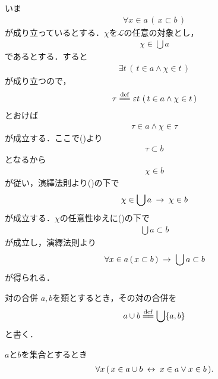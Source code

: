 	\begin{sketch}
		いま
		\begin{align}
			\forall x \in a\, (\, x \subset b\, )
			\label{fom:thm_union_of_subsets_is_subclass_1}
		\end{align}
		が成り立っているとする．$\chi$を$\mathcal{L}$の任意の対象とし，
		\begin{align}
			\chi \in \bigcup a
		\end{align}
		であるとする．すると
		\begin{align}
			\exists t\, \left(\, t \in a \wedge \chi \in t\, \right)
		\end{align}
		が成り立つので，
		\begin{align}
			\tau \defeq \varepsilon t\, \left(\, t \in a \wedge \chi \in t\, \right)
		\end{align}
		とおけば
		\begin{align}
			\tau \in a \wedge \chi \in \tau
		\end{align}
		が成立する．ここで()より
		\begin{align}
			\tau \subset b
		\end{align}
		となるから
		\begin{align}
			\chi \in b
		\end{align}
		が従い，演繹法則より()の下で
		\begin{align}
			\chi \in \bigcup a \hspace{0.25em}\rightarrow\hspace{0.25em} \chi \in b
		\end{align}
		が成立する．$\chi$の任意性ゆえに()の下で
		\begin{align}
			\bigcup a \subset b
		\end{align}
		が成立し，演繹法則より
		\begin{align}
			\forall x \in a\, (\, x \subset b\, ) \hspace{0.25em}\rightarrow\hspace{0.25em} \bigcup a \subset b
		\end{align}
		が得られる．
		\QED
	\end{sketch}
	
	\begin{itembox}[l]{対の合併}
		$a,b$を類とするとき，その対の合併を
		\begin{align}
			a \cup b \defeq \bigcup \{a,b\}
		\end{align}
		と書く．
	\end{itembox}
	
	\begin{screen}
		\begin{thm}[対の合併はそれぞれの要素を合わせたもの]\label{thm:union_of_pair_is_union_of_their_elements}
			$a$と$b$を集合とするとき
			\begin{align}
				\forall x\, (\, x \in a \cup b \hspace{0.25em}\leftrightarrow\hspace{0.25em} x \in a \vee x \in b\, ).
			\end{align}
		\end{thm}
	\end{screen}
	
